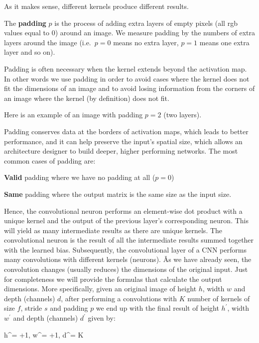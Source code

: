 As it makes sense, different kernels produce different results.

\bd[Padding]
The \textbf{padding} $p$ is the process of adding extra layers of empty pixels (all rgb values equal to 0) around an
image. We measure padding by the numbers of extra layers around the image (i.e.\ $p=0$ means no extra layer, $p=1$
means one extra layer and so on).
\ed

Padding is often necessary when the kernel extends beyond the activation map. In other words we use padding in order
to avoid cases where the kernel does not fit the dimensions of an image and to avoid losing information from the
corners of an image where the kernel (by definition) does not fit.

\be
Here is an example of an image with padding $p=2$ (two layers).

\ee

Padding conserves data at the borders of activation maps, which leads to better performance, and it can help preserve
the input's spatial size, which allows an architecture designer to build deeper, higher performing networks. The most
common cases of padding are:
\bit
\item \textbf{Valid} padding where we have no padding at all ($p=0$)
\item \textbf{Same} padding where the output matrix is the same size as the input size.
\eit

Hence, the convolutional neuron performs an element-wise dot product with a unique kernel and the output of the
previous layer's corresponding neuron. This will yield as many intermediate results as there are unique kernels. The
convolutional neuron is the result of all the intermediate results summed together with the learned bias.
Subsequently, the convolutional layer of a CNN performs many convolutions with different kernels (neurons). \v

As we have already seen, the convolution changes (usually reduces) the dimensions of the original input. Just for
completeness we will provide the formulas that calculate the output dimensions. More specifically, given an original
image of height $h$, width $w$ and depth (channels) $d$, after performing a convolutions with $K$ number of kernels
of size $f$, stride $s$ and padding $p$ we end up with the final result of height $h^\prime$, width $w^\prime$ and
depth (channels) $d^\prime$ given by:

\bse
h^\prime =  +1, \qquad w^\prime =  +1, \qquad d^\prime = K
\ese

